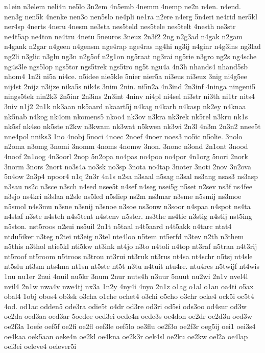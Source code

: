 {n1ein
n3elem
neli4n
ne5lo
3n2em
4n5emb
4nemm
4nemp
ne2n
n4en.
n4end.
nen3g
nen5k
4nenke
nen3o
nen5slo
ne4pli
ne1ra
n2ere
n4erg
5n4eri
ne4rid
ner5kl
ner4sp
4nerts
4neru
4nesm
ne3sta
nes5teld
nes5tele
nes5telt
4nesth
ne3str
ne4t5ap
ne4ton
ne4tru
4netu
5neuros
3neuz
2n3f2
2ng
n2g3ad
n4gak
n2gam
n4gank
n2gar
n4geen
n4gensm
nge4rap
nge4ras
ng4hi
ng3ij
n4ginr
n4g3ins
ng3lad
ng2li
n3glic
n3glu
ng3n
n2g5of
n2g1on
ng5raat
ng3rai
ng5rie
n3gro
ng2s
ng4sche
ng4s3le
ngs5lop
ngs5tor
ngs5trek
ngs5tro
ng5t
ngu4a
4n3h
nhands4
nhand5sb
nhom4
1n2i
ni5a
ni4ce.
n5idee
nie5kle
5nier
nier5a
ni3eus
ni3euz
3nig
ni4g5ee
nij4st
2nijz
n3ijze
nika5s
nik4s
3nim
2nin.
ni5n2a
4n3ind
2n3inf
4ninga
ningeni5
nings5tek
nin2k3
2n5inr
2n3ins
2n3int
4ninv
ni4pl
ni4sel
ni3str
ni3th
ni1tr
nits4
3niv
n1j2
2n1k
nk3aan
nk5aard
nkaart5j
n4kag
n4karb
n4kasp
nk2ey
n4knaa
nk5nab
n4kog
nk4om
nkomens5
nkoo4
nk3ov
n3kra
nk3rek
nk5rel
n3kru
nk1s
nk5sf
nk4so
nk5ste
n2kw
n3kwam
nk3wat
n5kwen
nk3wi
2n3l
4n3m
2n3n2
nnee5t
nne4pol
nniks3
1no
4nobj
5noci
4noec
2noef
4noer
noes3
no5ic
n5olie.
3nolo
n2oma
n3omg
3nomi
3nomm
4noms
4nomw
3non.
3nonc
n3ond
2n1ont
3nood
4noof
2n1oog
4n3oorl
2nop
5n2opa
no4pas
no4poo
no4por
4n1org
5nori
2nork
3norm
3nors
2nort
no3s4a
no3sk
no3sp
3nota
no4tap
3noter
3noti
2nov
3n2ova
5n4ow
2n3p4
npoor4
n1q
2n3r
4n1s
n2sa
n3saal
n5sag
n3sal
ns3ang
nsas3
ns3asp
n3sau
ns2c
n3sce
n3sch
n4sed
nsee5t
n4sef
n4seg
nsei5g
n5set
n2sev
ns3f
ns4fee
n3sjo
ns4kri
n3slaa
n2sle
ns5led
n5sliep
ns2m
ns3mar
n3sme
n5smij
ns3moe
n5smol
n4s3mu
n3sne
n3snij
n3snoe
n3soe
ns3onw
n3soor
n4spaa
n4spot
ns4ta
n4staf
n3ste
n4steh
n4s5tent
n4stenv
n5ster.
ns3the
ns4tie
n3stig
n4stij
nst5ing
n5ston.
nst5roos
n2sui
ns5uil
2n1t
n5taal
n4t5aard
n4t5akk
n4tarc
ntat4
ntdu5iker
n3teg
n2tei
nt3eig
n3tel
nte4loo
n5tem
nt5erfd
n3tev
n2th
n3them
n5this
n3thol
ntie5kl
nti5kw
nt3ink
nt4jo
n3to
n4toli
n4top
nt3raf
n5tran
n4t3rij
nt5roof
nt5room
n5troos
n3trou
nt3rui
nt3ruk
nt3rus
nt4sa
nt4schr
n5tsj
nt4sle
nt5slu
nt3sm
nts4ma
nt1sn
nt5ste
nt5t
n3tu
n4tuit
ntu4re.
ntu4res
n5twijf
nt4wis
1nu
nu1er
2nui
4nuil
nu5kr
3num
2nur
nuts4h
n3uur
5nuut
nu2wi
2n1v
nvel4l
nvil4
2n1w
nwa4v
nwe4tj
nx3a
1n2y
4ny4i
4nyo
2n1z
o1ag
o1al
o1an
oa4ti
o5ax
obal4
1obj
obos4
ob3sk
o3cha
o1che
ochet4
o3chi
o5cho
o3chr
ocke4
ock5i
oc5t4
4od.
od1ac
odden5
ode3ra
odie5t
o4dr
od3re
od3ri
od5si
ods3oo
od4sur
od3w
oe2da
oed3aa
oed3ar
5oedee
oed3ei
oede4n
oede3s
oe4don
oe2dr
oe2d3u
oed3w
oe2f3a
1oefe
oef5f
oe2fi
oe2fl
oef3le
oef5lo
oe3flu
oe2f3o
oe2f3r
oeg5ij
oei1
oei3s4
oe4kaa
oek5aan
oeke4n
oe2kl
oe4kna
oe2k3r
oek4sl
oe2ku
oe2kw
oel2a
oe4lap
oel3ei
oeleve4
oelever5i
}
